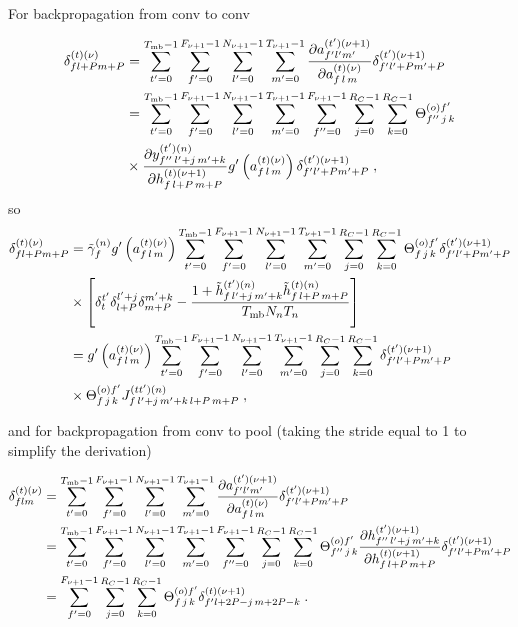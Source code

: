 \begin{subappendices}
For backpropagation from conv to conv

\begin{align}
\delta^{(t)(\nu)}_{fl+Pm+P}&=
%
\sum_{t'=0}^{T_{{\rm mb}}-1}\sum^{F_{\nu+1}-1}_{f'=0}\sum^{N_{\nu+1}-1}_{l'=0}\sum^{T_{\nu+1}-1}_{m'=0}
%
\frac{\partial a_{f'l'm'}^{(t')(\nu+1)}}{\partial a_{f\,l\,m}^{(t)(\nu)}}
%
\delta_{f'l'+Pm'+P}^{(t')(\nu+1)}\notag\\
%
&=\sum_{t'=0}^{T_{{\rm mb}}-1}\sum^{F_{\nu+1}-1}_{f'=0}\sum^{N_{\nu+1}-1}_{l'=0}\sum^{T_{\nu+1}-1}_{m'=0}
%
\sum^{F_{\nu+1}-1}_{f''=0}\sum^{R_C-1}_{j=0}\sum^{R_C-1}_{k=0}
%
\Theta^{(o)f'}_{f''\,j\,k}\notag\\
%
&\times\frac{\partial y^{(t')(n)}_{f''\,l'+j\,m'+k}}{\partial h_{f\,l+P\,m+P}^{(t)(\nu+1)}}
%
g'\left(a_{f\,l\,m}^{(t)(\nu)}\right)\delta_{f'l'+Pm'+P}^{(t')(\nu+1)}\;,
\end{align}
so
\begin{align}
\delta^{(t)(\nu)}_{fl+Pm+P}&=\tilde{\gamma}^{(n)}_fg'\left(a_{f\,l\,m}^{(t)(\nu)}\right)
%
\sum_{t'=0}^{T_{{\rm mb}}-1}\sum^{F_{\nu+1}-1}_{f'=0}\sum^{N_{\nu+1}-1}_{l'=0}\sum^{T_{\nu+1}-1}_{m'=0}
%
\sum^{R_C-1}_{j=0}\sum^{R_C-1}_{k=0}\Theta^{(o)f'}_{f\,j\,k}\delta_{f'l'+Pm'+P}^{(t')(\nu+1)}\notag\\
%
&\times \left[\delta^{t'}_t\delta^{ l'+j}_{l+P}\delta^{m'+k}_{m+P}-
%
\frac{1+\tilde{h}_{f\, l'+j\,m'+k}^{(t')(n)}\tilde{h}_{f\,l+P\,m+P}^{(t)(n)}}{T_{{\rm mb}}N_nT_n}\right]\notag\\
%
&=g'\left(a_{f\,l\,m}^{(t)(\nu)}\right)
%
\sum_{t'=0}^{T_{{\rm mb}}-1}\sum^{F_{\nu+1}-1}_{f'=0}\sum^{N_{\nu+1}-1}_{l'=0}\sum^{T_{\nu+1}-1}_{m'=0}
%
\sum^{R_C-1}_{j=0}\sum^{R_C-1}_{k=0}\delta_{f'l'+Pm'+P}^{(t')(\nu+1)}\notag\\
%
&\times \Theta^{(o)f'}_{f\,j\,k} J^{(tt')(n)}_{f\, l'+j\,m'+k\,l+P\,m+P}\;,
\end{align}

and for backpropagation from conv to pool (taking the stride equal to 1 to simplify the derivation)

\begin{align}
\delta^{(t)(\nu)}_{flm}&=
%
\sum_{t'=0}^{T_{{\rm mb}}-1}\sum^{F_{\nu+1}-1}_{f'=0}\sum^{N_{\nu+1}-1}_{l'=0}\sum^{T_{\nu+1}-1}_{m'=0}
%
\frac{\partial a_{f'l'm'}^{(t')(\nu+1)}}{\partial a_{f\,l\,m}^{(t)(\nu)}}
%
\delta_{f'l'+Pm'+P}^{(t')(\nu+1)}\notag\\
%
&=\sum_{t'=0}^{T_{{\rm mb}}-1}\sum^{F_{\nu+1}-1}_{f'=0}\sum^{N_{\nu+1}-1}_{l'=0}\sum^{T_{\nu+1}-1}_{m'=0}
%
\sum^{F_{\nu+1}-1}_{f''=0}\sum^{R_C-1}_{j=0}\sum^{R_C-1}_{k=0}
%
\Theta^{(o)f'}_{f''\,j\,k}
%
\frac{\partial h^{(t')(\nu+1)}_{f''\,l'+j\,m'+k}}{\partial h_{f\,l+P\,m+P}^{(t)(\nu+1)}}
%
\delta_{f'l'+Pm'+P}^{(t')(\nu+1)}\notag\\
%
&=\sum^{F_{\nu+1}-1}_{f'=0}\sum^{R_C-1}_{j=0}\sum^{R_C-1}_{k=0}
%
\Theta^{(o)f'}_{f\,j\,k}\delta_{f'l+2P-j\,m+2P-k}^{(t)(\nu+1)}\;.
\end{align}


\end{subappendices}
